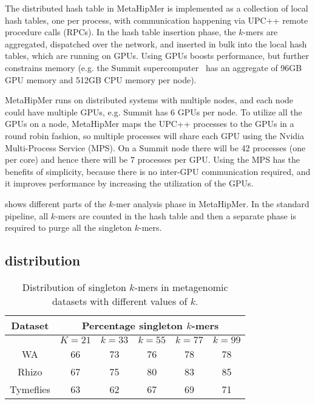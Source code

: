 The distributed hash table in MetaHipMer is implemented as a collection of local
hash tables, one per process, with communication happening via UPC++ remote
procedure calls (RPCs). In the hash table insertion phase, the $k$-mers are
aggregated, dispatched over the network, and inserted in bulk into the local
hash tables, which are running on GPUs. Using GPUs boosts performance, but
further constrains memory (e.g. the Summit supercomputer~\cite{VazhkudaiDBG18}
has an aggregate of 96GB GPU memory and 512GB CPU memory per node).

MetaHipMer runs on distributed systems with multiple nodes, and each node could
have multiple GPUs, e.g. Summit has 6 GPUs per node. To utilize all the GPUs on
a node, MetaHipMer maps the UPC++ processes to the GPUs in a round robin
fashion, so multiple processes will share each GPU using the Nvidia
Multi-Process Service (MPS). On a Summit node there will be 42 processes (one
per core) and hence there will be 7 processes per GPU\@. Using the MPS has the
benefits of simplicity, because there is no inter-GPU communication required,
and it improves performance by increasing the utilization of the GPUs.

 shows different parts of the $k$-mer analysis phase in
MetaHipMer. In the standard pipeline, all $k$-mers are counted in the hash table
and then a separate phase is required to purge all the singleton $k$-mers.

\subsection{\Kmer distribution}

\begin{wraptable}{r}{4.5in}
\centering
    \begin{tabular}{c | c | c | c | c | c}
    \toprule
    {\bf Dataset} & \multicolumn{5}{c}{\bf Percentage singleton $k$-mers} \\
    \midrule
    & $K=21$ & $k=33$ & $k=55$ & $k=77$ & $k=99$ \\
    \midrule
    WA &  66 & 73 & 76 & 78 & 78  \\
    Rhizo &  67 & 75 & 80 & 83 & 85  \\
    Tymeflies & 63 & 62 & 67 & 69 & 71 \\
    \bottomrule
    \end{tabular}
    \caption{Distribution of singleton $k$-mers in metagenomic datasets with different values of $k$.}
    \label{tab:kmer-dist}
\end{wraptable}

